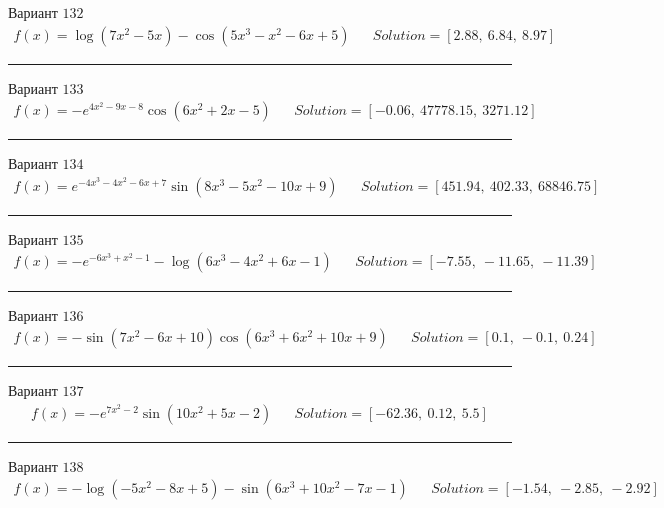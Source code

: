 \documentclass[11pt]{report}
\begin{document}
Вариант \(132\)
\begin{align*}
    f(x) = \log{\left(7 x^{2} - 5 x \right)} - \cos{\left(5 x^{3} - x^{2} - 6 x + 5 \right)} && Solution = \left[ 2.88, \  6.84, \  8.97\right]
\end{align*}
\begin{center}
    \noindent\rule{8cm}{0.4pt}
\end{center}
Вариант \(133\)
\begin{align*}
    f(x) = - e^{4 x^{2} - 9 x - 8} \cos{\left(6 x^{2} + 2 x - 5 \right)} && Solution = \left[ -0.06, \  47778.15, \  3271.12\right]
\end{align*}
\begin{center}
    \noindent\rule{8cm}{0.4pt}
\end{center}
Вариант \(134\)
\begin{align*}
    f(x) = e^{- 4 x^{3} - 4 x^{2} - 6 x + 7} \sin{\left(8 x^{3} - 5 x^{2} - 10 x + 9 \right)} && Solution = \left[ 451.94, \  402.33, \  68846.75\right]
\end{align*}
\begin{center}
    \noindent\rule{8cm}{0.4pt}
\end{center}
Вариант \(135\)
\begin{align*}
    f(x) = - e^{- 6 x^{3} + x^{2} - 1} - \log{\left(6 x^{3} - 4 x^{2} + 6 x - 1 \right)} && Solution = \left[ -7.55, \  -11.65, \  -11.39\right]
\end{align*}
\begin{center}
    \noindent\rule{8cm}{0.4pt}
\end{center}
Вариант \(136\)
\begin{align*}
    f(x) = - \sin{\left(7 x^{2} - 6 x + 10 \right)} \cos{\left(6 x^{3} + 6 x^{2} + 10 x + 9 \right)} && Solution = \left[ 0.1, \  -0.1, \  0.24\right]
\end{align*}
\begin{center}
    \noindent\rule{8cm}{0.4pt}
\end{center}
Вариант \(137\)
\begin{align*}
    f(x) = - e^{7 x^{2} - 2} \sin{\left(10 x^{2} + 5 x - 2 \right)} && Solution = \left[ -62.36, \  0.12, \  5.5\right]
\end{align*}
\begin{center}
    \noindent\rule{8cm}{0.4pt}
\end{center}
Вариант \(138\)
\begin{align*}
    f(x) = - \log{\left(- 5 x^{2} - 8 x + 5 \right)} - \sin{\left(6 x^{3} + 10 x^{2} - 7 x - 1 \right)} && Solution = \left[ -1.54, \  -2.85, \  -2.92\right]
\end{align*}
\end{document}
